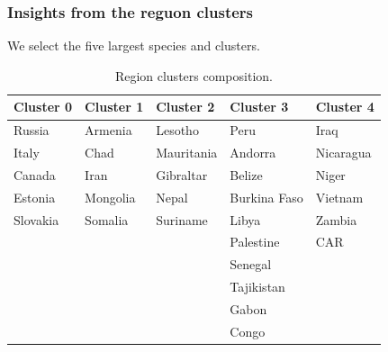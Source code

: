 \documentclass[
	11pt, %
]{beamer}
\begin{document}
\begin{frame}
\frametitle{Insights from the reguon clusters}
We select the five largest species and clusters.

\begin{table}[H]
\smaller
\centering
\begin{tabular}{|l|l|l|l|l|}
\hline
Cluster 0 & Cluster 1                 & Cluster 2  & Cluster 3           & Cluster 4                \\ \hline
Russia    & Armenia                   & Lesotho    & Peru                & Iraq                     \\ \hline
Italy     & Chad                      & Mauritania & Andorra             & Nicaragua                \\ \hline
Canada    & Iran  & Gibraltar  & Belize              & Niger                    \\ \hline
Estonia   & Mongolia                  & Nepal      & Burkina Faso        & Vietnam                  \\ \hline
Slovakia  & Somalia                   & Suriname   & Libya               & Zambia                   \\ \hline
          &                           &            & Palestine & CAR \\ \hline
          &                           &            & Senegal             &                          \\ \hline
          &                           &            & Tajikistan          &                          \\ \hline
          &                           &            & Gabon               &                          \\ \hline
          &                           &            & Congo               &                          \\ \hline
\end{tabular}
\caption{Region clusters composition.}
\label{table:clusters_region}
\end{table}

\end{frame}
\end{document}
